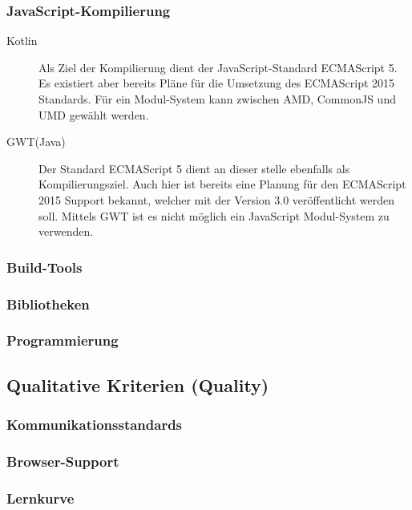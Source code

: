 \subsubsection{JavaScript-Kompilierung}
\begin{description}
	\item[Kotlin] Als Ziel der Kompilierung dient der JavaScript-Standard ECMAScript 5. Es existiert aber bereits Pläne für die Umsetzung des ECMAScript 2015 Standards. \cite{kotlinJavaScript} Für ein Modul-System kann zwischen \gls{AMD}, CommonJS und \gls{UMD} gewählt werden. \cite{kotlinJsModules} 
	\item[GWT(Java)] Der Standard ECMAScript 5 dient an dieser stelle ebenfalls als Kompilierungsziel. Auch hier ist bereits eine Planung für den ECMAScript 2015 Support bekannt, welcher mit der Version 3.0 veröffentlicht werden soll. \cite{gwtRoadmap} Mittels \gls{GWT} ist es nicht möglich ein JavaScript Modul-System zu verwenden.
\end{description}

\subsubsection{Build-Tools}

\subsubsection{Bibliotheken}

\subsubsection{Programmierung}


\subsection{Qualitative Kriterien (Quality)}
\subsubsection{Kommunikationsstandards}

\subsubsection{Browser-Support}

\subsubsection{Lernkurve}


